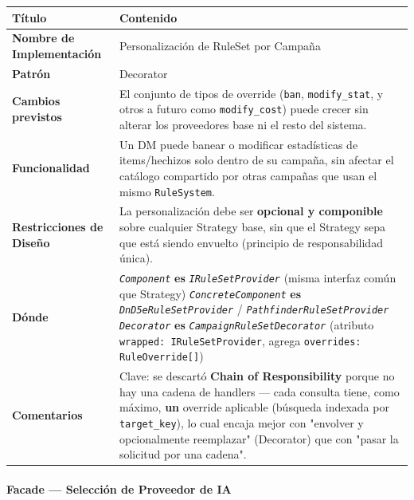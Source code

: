 {\small\setlength{\tabcolsep}{4pt}\renewcommand{\arraystretch}{1.15}
\begin{longtable}{|>{\raggedright\arraybackslash}p{3.4cm}|>{\raggedright\arraybackslash}p{11.9cm}|}
\hline
\textbf{Título} & \textbf{Contenido} \\ \hline\endhead
\textbf{Nombre de Implementación} & Personalización de RuleSet por Campaña \\ \hline
\textbf{Patrón} & Decorator \\ \hline
\textbf{Cambios previstos} & El conjunto de tipos de override (\texttt{ban}, \texttt{modify\_\allowbreak{}stat}, y otros a futuro como \texttt{modify\_\allowbreak{}cost}) puede crecer sin alterar los proveedores base ni el resto del sistema. \\ \hline
\textbf{Funcionalidad} & Un DM puede banear o modificar estadísticas de items/hechizos solo dentro de su campaña, sin afectar el catálogo compartido por otras campañas que usan el mismo \texttt{RuleSystem}. \\ \hline
\textbf{Restricciones de Diseño} & La personalización debe ser \textbf{opcional y componible} sobre cualquier Strategy base, sin que el Strategy sepa que está siendo envuelto (principio de responsabilidad única). \\ \hline
\textbf{Dónde} & \textit{\texttt{Component}} \textbf{es} \textit{\texttt{IRuleSetProvider}} (misma interfaz común que Strategy) \newline{} \textit{\texttt{ConcreteComponent}} \textbf{es} \textit{\texttt{DnD5eRuleSetProvider}} / \textit{\texttt{PathfinderRuleSetProvider}} \newline{} \textit{\texttt{Decorator}} \textbf{es} \textit{\texttt{CampaignRuleSetDecorator}} (atributo \texttt{wrapped: IRuleSetProvider}, agrega \texttt{overrides: RuleOverride[]}) \\ \hline
\textbf{Comentarios} & Clave: se descartó \textbf{Chain of Responsibility} porque no hay una cadena de handlers — cada consulta tiene, como máximo, \textbf{un} override aplicable (búsqueda indexada por \texttt{target\_\allowbreak{}key}), lo cual encaja mejor con "envolver y opcionalmente reemplazar" (Decorator) que con "pasar la solicitud por una cadena". \\ \hline
\end{longtable}}
\paragraph{Facade — Selección de Proveedor de IA}

